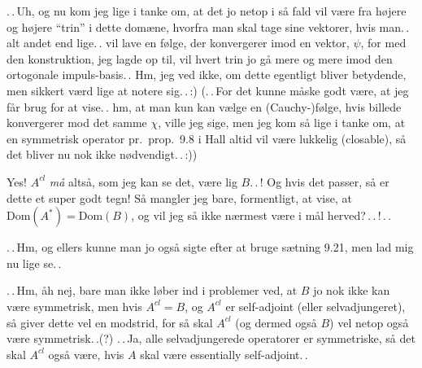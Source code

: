 \documentclass{report}
\begin{document}
.\,.\,Uh, og nu kom jeg lige i tanke om, at det jo netop i så fald vil være fra højere og højere ``trin'' i dette domæne, hvorfra man skal tage sine vektorer, hvis man.\,.\, alt andet end lige.\,. vil lave en følge, der konvergerer imod en vektor, $\psi$, for med den konstruktion, jeg lagde op til, vil hvert trin jo gå mere og mere imod den ortogonale impuls-basis.\,. Hm, jeg ved ikke, om dette egentligt bliver betydende, men sikkert værd lige at notere sig.\,.\,:) (.\,.\,For det kunne måske godt være, at jeg får brug for at vise.\,. hm, at man kun kan vælge en (Cauchy-)følge, hvis billede konvergerer mod det samme $\chi$, ville jeg sige, men jeg kom så lige i tanke om, at en symmetrisk operator pr.\ prop.\ 9.8 i Hall altid vil være lukkelig (closable), så det bliver nu nok ikke nødvendigt.\,.\,:)) 


Yes! $A^{cl}$ \emph{må} altså, som jeg kan se det, være lig $B$.\,.\,! Og hvis det passer, så er dette et super godt tegn! Så mangler jeg bare, formentligt, at vise, at $\mathrm{Dom}(A^*) = \mathrm{Dom}(B)$, og vil jeg så ikke nærmest være i mål herved?\,.\,.\,!\,.\,. 

.\,.\,Hm, og ellers kunne man jo også sigte efter at bruge sætning 9.21, men lad mig nu lige se.\,. 

.\,.\,Hm, åh nej, bare man ikke løber ind i problemer ved, at $B$ jo nok ikke kan være symmetrisk, men hvis $A^{cl}=B$, og $A^{cl}$ er self-adjoint (eller selvadjungeret), så giver dette vel en modstrid, for så skal $A^{cl}$ (og dermed også $B$) vel netop også være symmetrisk.\,.(?) .\,.\,Ja, alle selvadjungerede operatorer er symmetriske, så det skal $A^{cl}$ også være, hvis $A$ skal være essentially self-adjoint.\,. 
\end{document}
